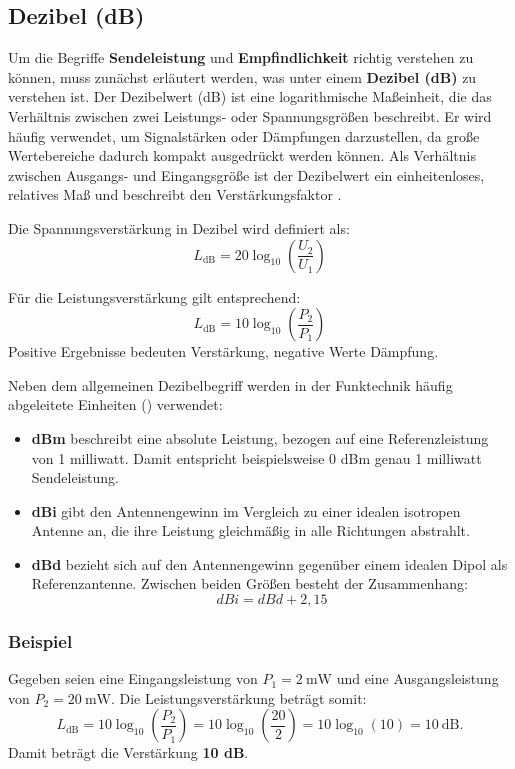 	\subsection{Dezibel (dB) \label{lora:decibel}}	
	Um die Begriffe \textbf{Sendeleistung} und \textbf{Empfindlichkeit} richtig verstehen zu können, muss zunächst erläutert werden, was unter einem \textbf{Dezibel (dB)} zu verstehen ist. Der Dezibelwert (dB) ist eine logarithmische Ma{\ss}einheit, die das Verhältnis zwischen zwei Leistungs- oder Spannungsgrö{\ss}en beschreibt. Er wird häufig verwendet, um Signalstärken oder Dämpfungen darzustellen, da gro{\ss}e Wertebereiche dadurch kompakt ausgedrückt werden können. Als Verhältnis zwischen Ausgangs- und Eingangsgrö{\ss}e ist der Dezibelwert ein einheitenloses, relatives Ma{\ss} und beschreibt den Verstärkungsfaktor \cite[337-339]{Stiny:2024}.
	
	Die Spannungsverstärkung in Dezibel wird definiert als:
	\[
	L_\text{dB} = 20 \log_{10}\!\left(\frac{U_2}{U_1}\right)
	\]
	
	Für die Leistungsverstärkung gilt entsprechend:
	\[
	L_\text{dB} = 10 \log_{10}\!\left(\frac{P_2}{P_1}\right)
	\]
	Positive Ergebnisse bedeuten Verstärkung, negative Werte Dämpfung.
	
	\vspace{0.5cm}
	
	Neben dem allgemeinen Dezibelbegriff werden in der Funktechnik häufig abgeleitete Einheiten (\cite{ETSI:2018}) verwendet:
	\begin{itemize}
		\item \textbf{dBm} beschreibt eine absolute Leistung, bezogen auf eine Referenzleistung von 1 milliwatt. Damit entspricht beispielsweise 0 dBm genau 1 milliwatt Sendeleistung.
		\item \textbf{dBi} gibt den Antennengewinn im Vergleich zu einer idealen isotropen Antenne an, die ihre Leistung gleichmä{\ss}ig in alle Richtungen abstrahlt.
		\item \textbf{dBd} bezieht sich auf den Antennengewinn gegenüber einem idealen Dipol als Referenzantenne. Zwischen beiden Grö{\ss}en besteht der Zusammenhang:
		\[
		dBi=dBd+2,15
		\]
	\end{itemize}

	\subsubsection{Beispiel}
	Gegeben seien eine Eingangsleistung von $P_1 = 2~\text{mW}$	und eine Ausgangsleistung von $P_2 = 20~\text{mW}$.
	Die Leistungsverstärkung beträgt somit:
	\[
	L_\text{dB} = 10 \log_{10}\!\left(\frac{P_2}{P_1}\right)
	= 10 \log_{10}\!\left(\frac{20}{2}\right)
	= 10 \log_{10}(10)
	= 10~\text{dB}.
	\]
	Damit beträgt die Verstärkung \textbf{10 dB}.
	

